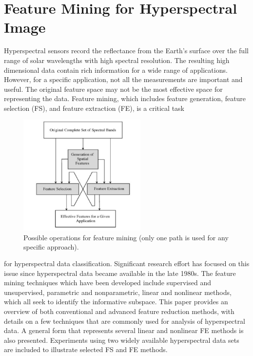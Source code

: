 \documentclass[document.tex]{subfiles}
\begin{document}
\section{Feature Mining for Hyperspectral Image}
\noindent Hyperspectral sensors record the reflectance from the Earth’s surface over the full range
of solar wavelengths with high spectral resolution. The resulting high dimensional data
contain rich information for a wide range of applications. However, for a specific application, not all the measurements are important and useful. The original feature space may
not be the most effective space for representing the data. Feature mining, which includes
feature generation, feature selection (FS), and feature extraction (FE), is a critical task
\begin{figure}[H]
	\begin{center}
		\includegraphics[height=6.0cm]{imgs/OperationFeatureMining.png}
	\end{center}
	\caption{Possible operations for feature mining (only one path is used for any specific
		approach).}
	\label{fig:Possible operations for feature mining (only one path is used for any specific
		approach).}
\end{figure}
for hyperspectral data classification. Significant research effort has focused on this issue since hyperspectral data became available in the late 1980s. The feature mining techniques which have been developed include supervised and unsupervised, parametric and
nonparametric, linear and nonlinear methods, which all seek to identify the informative
subspace. This paper provides an overview of both conventional and advanced feature
reduction methods, with details on a few techniques that are commonly used for analysis
of hyperspectral data. A general form that represents several linear and nonlinear FE
methods is also presented. Experiments using two widely available hyperspectral data
sets are included to illustrate selected FS and FE methods.
\end{document}
